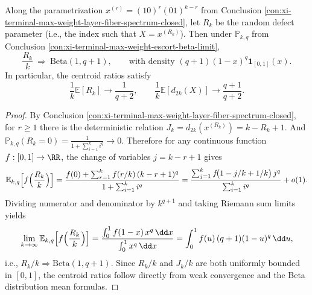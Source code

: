 \begin{conclusion}\label{con:xi-terminal-max-weight-defect-localization}
Along the parametrization \(x^{(r)}=(10)^r(01)^{k-r}\) from Conclusion \ref{con:xi-terminal-max-weight-layer-fiber-spectrum-closed}, let \(R_k\) be the random defect parameter (i.e., the index such that \(X=x^{(R_k)}\)).
Then under \(\mathbb{P}_{k,q}\) from Conclusion \ref{con:xi-terminal-max-weight-escort-beta-limit},
\[
\frac{R_k}{k}\ \Rightarrow\ \mathrm{Beta}(1,q+1),
\qquad \text{with density }(q+1)(1-x)^q\mathbf 1_{[0,1]}(x).
\]
In particular, the centroid ratios satisfy
\[
\frac{1}{k}\mathbb{E}[R_k]\to \frac{1}{q+2},
\qquad
\frac{1}{k}\mathbb{E}[d_{2k}(X)]\to \frac{q+1}{q+2}.
\]
\end{conclusion}
\begin{proof}
By Conclusion \ref{con:xi-terminal-max-weight-layer-fiber-spectrum-closed}, for \(r\ge 1\) there is the deterministic relation
\(
J_k=d_{2k}(x^{(R_k)})=k-R_k+1
\).
And
\(
\mathbb{P}_{k,q}(R_k=0)=\frac{1}{1+\sum_{i=1}^{k}i^q}\to 0
\).
Therefore for any continuous function \(f:[0,1]\to\RR\), the change of variables \(j=k-r+1\) gives
\[
\mathbb{E}_{k,q}\Bigl[f\Bigl(\frac{R_k}{k}\Bigr)\Bigr]
=\frac{f(0)+\sum_{r=1}^{k} f(r/k)\,(k-r+1)^q}{1+\sum_{i=1}^{k}i^q}
=\frac{\sum_{j=1}^{k} f\!\bigl(1-j/k+1/k\bigr)\,j^q}{\sum_{i=1}^{k}i^q}+o(1).
\]
Dividing numerator and denominator by \(k^{q+1}\) and taking Riemann sum limits yields
\[
\lim_{k\to\infty}\mathbb{E}_{k,q}\Bigl[f\Bigl(\frac{R_k}{k}\Bigr)\Bigr]
=\frac{\int_{0}^{1} f(1-x)\,x^q\,\dd x}{\int_{0}^{1}x^q\,\dd x}
=\int_{0}^{1} f(u)\,(q+1)(1-u)^q\,\dd u,
\]
i.e., \(R_k/k\Rightarrow \mathrm{Beta}(1,q+1)\).
Since \(R_k/k\) and \(J_k/k\) are both uniformly bounded in \([0,1]\), the centroid ratios follow directly from weak convergence and the Beta distribution mean formulas.
\end{proof}

